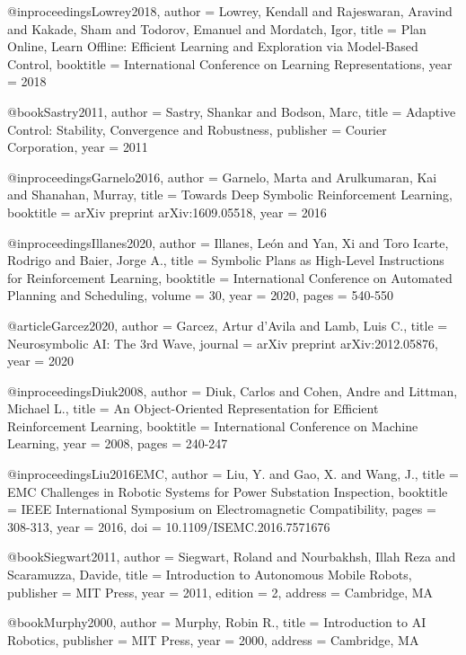 @inproceedings{Lowrey2018,
  author = {Lowrey, Kendall and Rajeswaran, Aravind and Kakade, Sham and Todorov, Emanuel and Mordatch, Igor},
  title = {Plan Online, Learn Offline: Efficient Learning and Exploration via Model-Based Control},
  booktitle = {International Conference on Learning Representations},
  year = {2018}
}

@book{Sastry2011,
  author = {Sastry, Shankar and Bodson, Marc},
  title = {Adaptive Control: Stability, Convergence and Robustness},
  publisher = {Courier Corporation},
  year = {2011}
}

@inproceedings{Garnelo2016,
  author = {Garnelo, Marta and Arulkumaran, Kai and Shanahan, Murray},
  title = {Towards Deep Symbolic Reinforcement Learning},
  booktitle = {arXiv preprint arXiv:1609.05518},
  year = {2016}
}

@inproceedings{Illanes2020,
  author = {Illanes, León and Yan, Xi and Toro Icarte, Rodrigo and Baier, Jorge A.},
  title = {Symbolic Plans as High-Level Instructions for Reinforcement Learning},
  booktitle = {International Conference on Automated Planning and Scheduling},
  volume = {30},
  year = {2020},
  pages = {540-550}
}

@article{Garcez2020,
  author = {Garcez, Artur d'Avila and Lamb, Luis C.},
  title = {Neurosymbolic AI: The 3rd Wave},
  journal = {arXiv preprint arXiv:2012.05876},
  year = {2020}
}

@inproceedings{Diuk2008,
  author = {Diuk, Carlos and Cohen, Andre and Littman, Michael L.},
  title = {An Object-Oriented Representation for Efficient Reinforcement Learning},
  booktitle = {International Conference on Machine Learning},
  year = {2008},
  pages = {240-247}
}

@inproceedings{Liu2016EMC,
  author = {Liu, Y. and Gao, X. and Wang, J.},
  title = {EMC Challenges in Robotic Systems for Power Substation Inspection},
  booktitle = {IEEE International Symposium on Electromagnetic Compatibility},
  pages = {308-313},
  year = {2016},
  doi = {10.1109/ISEMC.2016.7571676}
}

@book{Siegwart2011,
  author = {Siegwart, Roland and Nourbakhsh, Illah Reza and Scaramuzza, Davide},
  title = {Introduction to Autonomous Mobile Robots},
  publisher = {MIT Press},
  year = {2011},
  edition = {2},
  address = {Cambridge, MA}
}

@book{Murphy2000,
  author = {Murphy, Robin R.},
  title = {Introduction to AI Robotics},
  publisher = {MIT Press},
  year = {2000},
  address = {Cambridge, MA}
}

